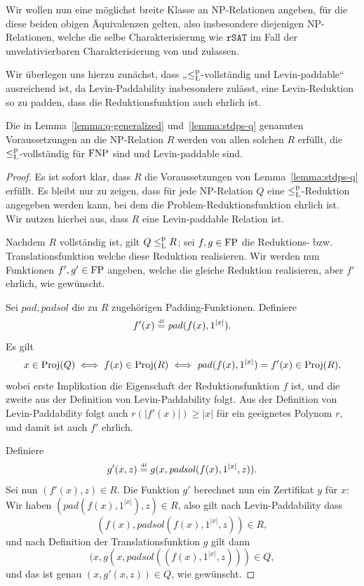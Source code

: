 Wir wollen nun eine möglichst breite Klasse an NP-Relationen angeben, für die diese beiden obigen Äquivalenzen gelten, also insbesondere diejenigen NP-Relationen, welche die selbe Charakterisierung wie $\mathtt{rSAT}$ im Fall der unvelativierbaren Charakterisierung von \citeauthor{fenner_inverting_2003} und \citeauthor{messner_simulation_2001} zulassen.

Wir überlegen uns hierzu zunächst, dass „$\leq_\mathrm{L}^\mathrm{p}$-vollständig und Levin-paddable“ ausreichend ist, da Levin-Paddability insbesondere zulässt, eine Levin-Reduktion so zu padden, dass die Reduktionsfunktion auch ehrlich ist.
\begin{lemma}
    Die in Lemma~\ref{lemma:q-generalized} und~\ref{lemma:stdps-q} genannten Voraussetzungen an die NP-Relation $R$ werden von allen solchen $R$ erfüllt, die $\leq_\mathrm{L}^\mathrm{p}$-vollständig für $\mathrm{FNP}$ sind und Levin-paddable sind.
\end{lemma}
\begin{proof}
    Es ist sofort klar, dass $R$ die Voraussetzungen von Lemma~\ref{lemma:stdps-q} erfüllt.
    Es bleibt nur zu zeigen, dass für jede NP-Relation $Q$ eine $\leq_\mathrm{L}^\mathrm{p}$-Reduktion angegeben werden kann, bei dem die Problem-Reduktionsfunktion ehrlich ist.
    Wir nutzen hierbei aus, dass $R$ eine Levin-paddable Relation ist.

    Nachdem $R$ vollständig ist, gilt $Q\leq_\mathrm{L}^\mathrm{p} R$; sei $f,g\in\mathrm{FP}$ die Reduktions- bzw. Translationsfunktion welche diese Reduktion realisieren. Wir werden nun Funktionen $f', g'\in\mathrm{FP}$ angeben, welche die gleiche Reduktion realisieren, aber $f'$ ehrlich, wie gewünscht.

    Sei $\mathit{pad}, \mathit{padsol}$ die zu $R$ zugehörigen Padding-Funktionen. Definiere
    \[ f'(x) \stackrel{\text{\smash{\tiny df}}}{=}  \mathit{pad}(f(x), 1^{|x|}). \]
    Es gilt
    \[ x\in\operatorname{Proj}(Q) \iff f(x)\in \operatorname{Proj}(R) \iff \mathit{pad}(f(x), 1^{|x|})=f'(x)\in\operatorname{Proj}(R), \]
    wobei erste Implikation die Eigenschaft der Reduktionsfunktion $f$ ist, und die zweite aus der Definition von Levin-Paddability folgt.
    Aus der Definition von  Levin-Paddability folgt auch $r(|f'(x)|)\geq |x|$ für ein geeignetes Polynom $r$, und damit ist auch $f'$ ehrlich.

    Definiere
    \[ g'(x, z) \stackrel{\text{\smash{\tiny df}}}{=}  g(x, \mathit{padsol}(f(x), 1^{|x|}, z)). \]
    Sei nun $(f'(x), z)\in R$. Die Funktion $g'$ berechnet nun ein Zertifikat $y$ für $x$: Wir haben $(\mathit{pad}(f(x), 1^{|x|}), z)\in R$, also gilt nach Levin-Paddability dass \[(f(x), \mathit{padsol}(f(x), 1^{|x|}, z))\in R,\] 
    und nach Definition der Translationsfunktion $g$ gilt dann
    \[(x, g(x, \mathit{padsol}((f(x), 1^{|x|}, z)))\in Q,\]
    und das ist genau $(x, g'(x, z))\in Q$, wie gewünscht.
\end{proof}

